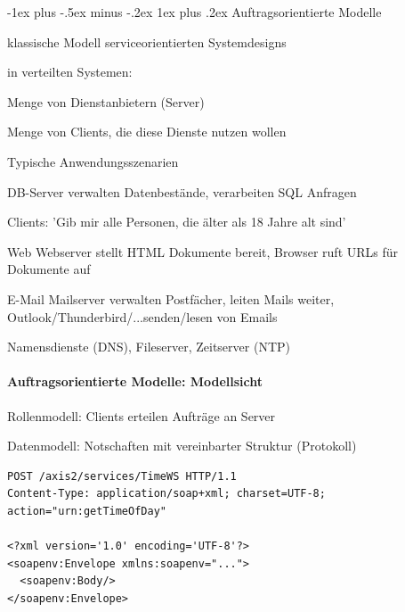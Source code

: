 \documentclass[10pt]{article}
\makeatletter
\renewcommand{\subsubsection}{\@startsection{subsubsection}{3}{0mm}%
                                {-1ex plus -.5ex minus -.2ex}%
                                {1ex plus .2ex}%
                                {\normalfont\small\bfseries}}
\makeatother
\begin{document}
  \subsubsection{Auftragsorientierte Modelle}
  \begin{itemize*}
    \item klassische Modell serviceorientierten Systemdesigns
    \item in verteilten Systemen:
    \begin{itemize*}
      \item Menge von Dienstanbietern (Server)
      \item Menge von Clients, die diese Dienste nutzen wollen
    \end{itemize*}
  \end{itemize*}
  Typische Anwendungsszenarien
  \begin{description*}
    \item[DB-Server] verwalten Datenbestände, verarbeiten SQL Anfragen
    \begin{itemize*}
      \item Clients: 'Gib mir alle Personen, die älter als 18 Jahre alt sind'
    \end{itemize*}
    \item[Web] Webserver stellt HTML Dokumente bereit, Browser ruft URLs für Dokumente auf
    \item[E-Mail] Mailserver verwalten Postfächer, leiten Mails weiter, Outlook/Thunderbird/...senden/lesen von Emails
    \item[Namensdienste (DNS), Fileserver, Zeitserver (NTP)]
  \end{description*}
  
  \paragraph{Auftragsorientierte Modelle: Modellsicht}
  
  \begin{itemize*}
    \item Rollenmodell: Clients erteilen Aufträge an Server
    \item Datenmodell: Notschaften mit vereinbarter Struktur (Protokoll)
  \end{itemize*}
  \begin{lstlisting}
POST /axis2/services/TimeWS HTTP/1.1
Content-Type: application/soap+xml; charset=UTF-8;
action="urn:getTimeOfDay"

<?xml version='1.0' encoding='UTF-8'?>
<soapenv:Envelope xmlns:soapenv="...">
  <soapenv:Body/>
</soapenv:Envelope>
\end{lstlisting}
  
\end{document}
